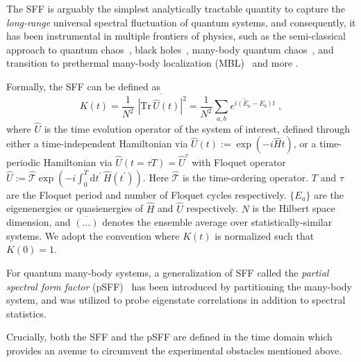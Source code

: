 \documentclass[aps,prx,reprint,twocolumn,superscriptaddress,floatfix,nofootinbib]{revtex4-2}
\newcommand{\N}{N}
\newcommand{\Uh}{\hat{U}}
\newcommand{\Hh}{\hat{H}}
\begin{document}
The SFF is arguably the simplest analytically tractable quantity to capture the \textit{long-range} universal spectral fluctuation of quantum systems, and consequently, it has been instrumental in multiple frontiers of physics, such as the semi-classical approach to quantum chaos~\cite{berry1985semiclassical, Sieber_2001, muller_2004, muller_2005},  black holes~\cite{kitaev2015simple, garciagarcia2016, Cotler_2017, Saad2019semiclassical}, many-body quantum chaos~\cite{chan2018solution, kos_sff_prx_2018, chan2018spectral, bertini2018exact}, and transition to prethermal many-body localization (MBL)~\cite{basko2006metal, oganesyan2007localization, chaoschallengeMBL, Prakash2021} and more \cite{Cotler_2017complexity, del_Campo_2017, ALTLAND201845, Liu_2018, liaogalitski2020, chan2020lyap, roy2020random, SUNTAJS2021168469, winer2022hydrodynamic, sfffilter2022delcampo, Winer_2022glass, santos2022}.

Formally, the SFF can be defined as
\begin{equation}\label{eq:sff_def}
K(t)
= \frac{1}{\N^2} \overline{\, \,
\left| \mathrm{Tr}\, \Uh(t)
\right|^2

}
= \frac{1}{\N^2} \overline{\sum_{a,b} e^{i(E_a-E_b)t}}
\;,
\end{equation}
where $\hat{U}$ is the time evolution operator of the system of interest, defined through either a time-independent Hamiltonian via $\Uh(t ):= \exp\left( -i\Hh t \right)$, or a time-periodic Hamiltonian via $\hat{U}(t= \tau T)= \hat{U}^\tau$ with Floquet operator $\Uh:=\mathcal{\hat{T}} \exp\left(-i\int_0^{T} \mathrm{d}t^{\prime} \, \hat{H}(t^{\prime})\right)$.
Here $\mathcal{\hat{T}}$ is the time-ordering operator. $T$  and $\tau$ are the Floquet period and number of Floquet cycles respectively. $\{ E_{a} \}$ are the eigenenergies or quasienergies of $\Hh$ and $\Uh$ respectively. $\N$ is the Hilbert space dimension, and $\overline{(\dots )}$ denotes the ensemble average over statistically-similar systems. We adopt the convention where $K(t)$ is normalized such that $K(0)=1$.

For quantum many-body systems, a generalization of SFF called the \textit{partial spectral form factor} (pSFF)~\cite{ZollerSFF2021, Gong_2020,  Garratt2021prx} has been introduced by partitioning the many-body system, and was utilized to probe eigenstate correlations in addition to spectral statistics.

Crucially, both the SFF and the pSFF are defined in the time domain which provides an avenue to circumvent the experimental obstacles mentioned above.
\end{document}
